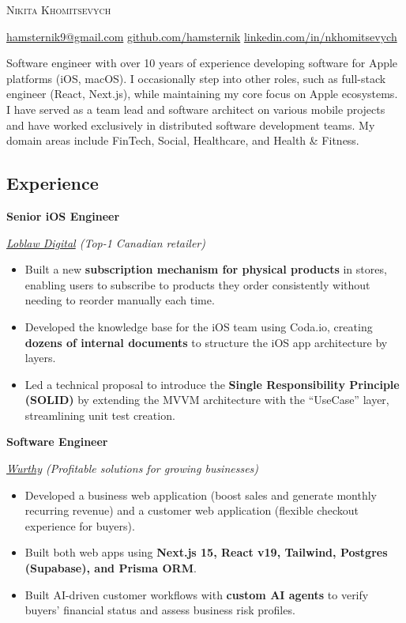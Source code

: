 \documentclass[10pt]{article}
\newcommand{\SectionSpacing}{ %
    \vspace*{1em}
}
\newcommand{\SubSectionSpacing}{
    \vspace*{0.5em}
}
\newcommand{\Experience}[3]{%
    \noindent \textbf{#1}
    \hfill \text{#2} \par
    \noindent \textit{#3} \par
    \normalsize \normalfont \par
}
\begin{document}
\textsc{\huge{Nikita Khomitsevych}}

\SectionSpacing

\noindent
\href{mailto:hamsternik9@gmail.com}{hamsternik9@gmail.com} \text{\textbar}
\href{https://github.com/hamsternik}{github.com/hamsternik} \text{\textbar}
\href{https://www.linkedin.com/in/nkhomitsevych/}{linkedin.com/in/nkhomitsevych}

\SectionSpacing

\noindent
Software engineer with over 10 years of experience developing software for Apple platforms (iOS, macOS). 
I occasionally step into other roles, such as full-stack engineer (React, Next.js), while maintaining my core focus on Apple ecosystems. 
I have served as a team lead and software architect on various mobile projects and have worked exclusively in distributed software development teams. 
My domain areas include FinTech, Social, Healthcare, and Health \& Fitness.


\subsection*{Experience}

\Experience
{Senior iOS Engineer}
{Jul 2024 -- Jan 2025}
{\href{https://www.loblawdigital.co}{Loblaw Digital} (Top-1 Canadian retailer)}

\noindent
\begin{itemize}[label=-]
  \setlength\itemsep{0cm}
  \item Built a new \textbf{subscription mechanism for physical products} in stores, enabling users to subscribe to products they order consistently without needing to reorder manually each time.
  \item Developed the knowledge base for the iOS team using Coda.io, creating \textbf{dozens of internal documents} to structure the iOS app architecture by layers. 
  \item Led a technical proposal to introduce the \textbf{Single Responsibility Principle (SOLID)} by extending the MVVM architecture with the “UseCase” layer, streamlining unit test creation. 
\end{itemize}

\SubSectionSpacing

\Experience
{Software Engineer}
{Nov 2023 -- Jan 2025}
{\href{https://www.wurthy.co}{Wurthy} (Profitable solutions for growing businesses)}

\noindent
\begin{itemize}[label=-]
  \setlength\itemsep{0em}
  \item Developed a business web application (boost sales and generate monthly recurring revenue) and a customer web application (flexible checkout experience for buyers).
  \item Built both web apps using \textbf{Next.js 15, React v19, Tailwind, Postgres (Supabase), and Prisma ORM}.
  \item Built AI-driven customer workflows with \textbf{custom AI agents} to verify buyers' financial status and assess business risk profiles.
\end{itemize}
\end{document}
